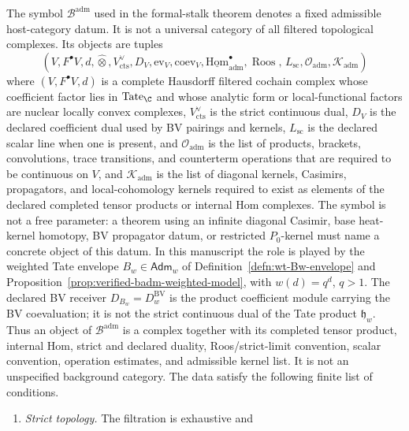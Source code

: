\begin{defn}\label{defn:admissible-host-category}
  The symbol \(\mathcal B^{\mathrm{adm}}\) used in the formal-stalk
  theorem denotes a fixed admissible host-category datum.  It is not a
  universal category of all filtered topological complexes.  Its objects
  are tuples
  \[
    (V,F^\bullet V,d,\widehat\otimes,V^\vee_{\mathrm{cts}},
    D_V,\mathrm{ev}_V,\mathrm{coev}_V,
    \underline{\mathrm{Hom}}^\bullet_{\mathrm{adm}},
    \operatorname{Roos},\,L_{\mathrm{sc}},
    \mathcal O_{\mathrm{adm}},\mathcal K_{\mathrm{adm}})
  \]
  where \((V,F^\bullet V,d)\) is a complete Hausdorff filtered cochain
  complex whose coefficient factor lies in \(\mathrm{Tate}_\C\) and
  whose analytic form or local-functional factors are nuclear
  locally convex complexes, \(V^\vee_{\mathrm{cts}}\) is the strict
  continuous dual, \(D_V\) is the declared coefficient dual used by BV
  pairings and kernels, \(L_{\mathrm{sc}}\) is the declared scalar line
  when one is present, and \(\mathcal O_{\mathrm{adm}}\) is the
  list of products, brackets, convolutions, trace transitions, and
  counterterm operations that are required to be continuous on \(V\), and
  \(\mathcal K_{\mathrm{adm}}\) is the list of diagonal kernels,
  Casimirs, propagators, and local-cohomology kernels required to exist
  as elements of the declared completed tensor products or internal Hom
  complexes.  The symbol is not a free parameter: a theorem using an
  infinite diagonal Casimir, base heat-kernel homotopy, BV propagator
  datum, or restricted \(P_0\)-kernel must name a concrete object of this
  datum.  In this manuscript the role is played by the weighted Tate
  envelope
  \(B_w\in\mathsf{Adm}_w\) of
  Definition~\ref{defn:wt-Bw-envelope} and
  Proposition~\ref{prop:verified-badm-weighted-model}, with
  \(w(d)=q^d\), \(q>1\).  The declared BV receiver
  \(D_{B_w}=D^{\mathrm{BV}}_w\) is the product
  coefficient module carrying the BV coevaluation; it is not the strict
  continuous dual of the Tate product \(\mathfrak h_w\).  Thus an object of
  \(\mathcal B^{\mathrm{adm}}\) is a complex together with its
  completed tensor product, internal Hom, strict and declared duality,
  Roos/strict-limit convention, scalar convention, operation estimates,
  and admissible kernel list.  It is not an unspecified background
  category.  The data satisfy the following finite list of conditions.
  \begin{enumerate}[label=\textup{(A\arabic*)}]
    \item \emph{Strict topology.}  The filtration is exhaustive and

\end{enumerate}
\end{defn}
